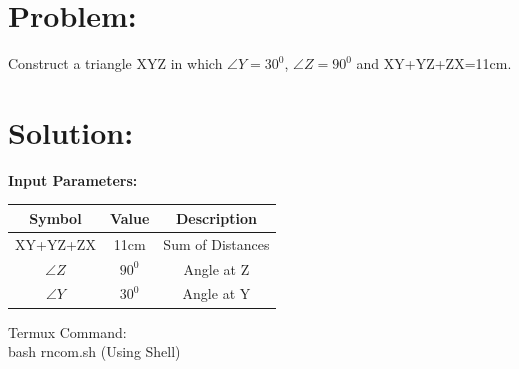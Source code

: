 \documentclass[10pt,a4paper]{report}
\begin{document}
\begin{multicols}{2}

\section{Problem:}  
Construct a triangle XYZ in which $\angle{Y}=30^0$, $\angle{Z}=90^0$ and  XY+YZ+ZX=11cm.\vspace{2mm}

\section{Solution: }
\raggedright \textbf{Input Parameters:}\\
\vspace{1mm}
\begin{center}
\begin{tabular}{|c|c|c|}
	\hline
	\textbf{Symbol}&\textbf{Value}&\textbf{Description}\\
	\hline
	XY+YZ+ZX & 11cm & Sum of Distances\\
	\hline 
	$\angle{Z}$ & $90^0$ & Angle at Z \\
	\hline
	$\angle{Y}$ & $30^0$ & Angle at Y \\
	\hline
	
\end{tabular}
\end{center}
\vspace{3mm}



\raggedright Termux Command:\\
               \centering bash rncom.sh (Using Shell)\\
               \vspace{3mm} 


\end{multicols}
\end{document}
